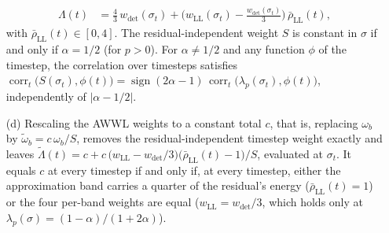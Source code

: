 \begin{proposition}
\begin{enumerate}
\begin{align}
    \Lambda(t) &= \frac{4}{3}\,w_{\det}(\sigma_t)
      + \Big(w_{\mathrm{LL}}(\sigma_t) - \frac{w_{\det}(\sigma_t)}{3}\Big)\,\bar\rho_{\mathrm{LL}}(t),
    \label{eq:awwl-eff}
  \end{align}
  with $\bar\rho_{\mathrm{LL}}(t) \in [0, 4]$. The residual-independent weight
  $S$ is constant in $\sigma$ if and only if $\alpha = 1/2$ (for $p > 0$). For
  $\alpha \neq 1/2$ and any function $\phi$ of the timestep, the correlation over
  timesteps satisfies
  $\operatorname{corr}_t\big(S(\sigma_t), \phi(t)\big)
  = \operatorname{sign}(2\alpha - 1)\,\operatorname{corr}_t\big(\lambda_p(\sigma_t), \phi(t)\big)$,
  independently of $\lvert\alpha - 1/2\rvert$.
  \item[(d)] Rescaling the AWWL weights to a constant total $c$, that is,
  replacing $\omega_b$ by $\tilde\omega_b = c\,\omega_b/S$, removes the
  residual-independent timestep weight exactly and leaves
  $\tilde\Lambda(t) = c + c\,\big(w_{\mathrm{LL}} - w_{\det}/3\big)\big(\bar\rho_{\mathrm{LL}}(t) - 1\big)/S$,
  evaluated at $\sigma_t$. It equals $c$ at every timestep if and only if, at
  every timestep, either the approximation band carries a quarter of the
  residual's energy ($\bar\rho_{\mathrm{LL}}(t) = 1$) or the four per-band
  weights are equal ($w_{\mathrm{LL}} = w_{\det}/3$, which holds only at
  $\lambda_p(\sigma) = (1-\alpha)/(1+2\alpha)$).
\end{enumerate}
\end{proposition}

